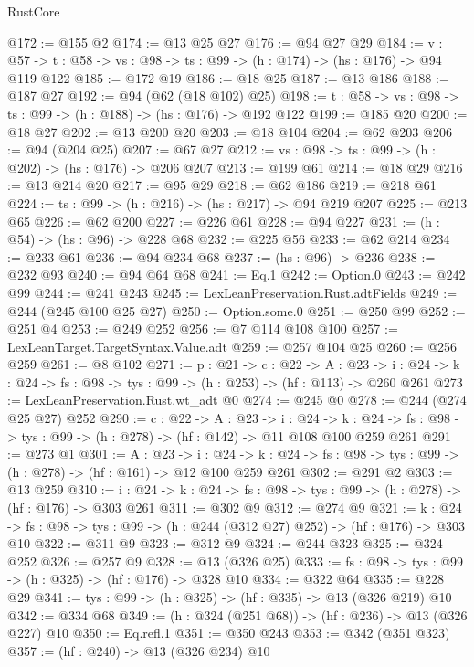 \begin{lexlean}{RustCore}
\begin{coremodule}
@172 := @155 @2
@174 := @13 @25 @27
@176 := @94 @27 @29
@184 := {v : @57} ->
  {t : @58} -> {vs : @98} -> {ts : @99} -> (h : @174) -> (hs : @176) -> @94 @119 @122
@185 := @172 @19
@186 := @18 @25
@187 := @13 @186
@188 := @187 @27
@192 := @94 (@62 (@18 @102) @25)
@198 := {t : @58} -> {vs : @98} -> {ts : @99} -> (h : @188) -> (hs : @176) -> @192 @122
@199 := @185 @20
@200 := @18 @27
@202 := @13 @200 @20
@203 := @18 @104
@204 := @62 @203
@206 := @94 (@204 @25)
@207 := @67 @27
@212 := {vs : @98} -> {ts : @99} -> (h : @202) -> (hs : @176) -> @206 @207
@213 := @199 @61
@214 := @18 @29
@216 := @13 @214 @20
@217 := @95 @29
@218 := @62 @186
@219 := @218 @61
@224 := {ts : @99} -> (h : @216) -> (hs : @217) -> @94 @219 @207
@225 := @213 @65
@226 := @62 @200
@227 := @226 @61
@228 := @94 @227
@231 := (h : @54) -> (hs : @96) -> @228 @68
@232 := @225 @56
@233 := @62 @214
@234 := @233 @61
@236 := @94 @234 @68
@237 := (hs : @96) -> @236
@238 := @232 @93
@240 := @94 @64 @68
@241 := Eq.{1}
@242 := Option.{0}
@243 := @242 @99
@244 := @241 @243
@245 := LexLeanPreservation.Rust.adtFields
@249 := @244 (@245 @100 @25 @27)
@250 := Option.some.{0}
@251 := @250 @99
@252 := @251 @4
@253 := @249 @252
@256 := @7 @114 @108 @100
@257 := LexLeanTarget.TargetSyntax.Value.adt
@259 := @257 @104 @25
@260 := @256 @259
@261 := @8 @102
@271 := {p : @21} ->
  {c : @22} ->
  {A : @23} ->
  {i : @24} -> {k : @24} -> {fs : @98} -> {tys : @99} -> (h : @253) -> (hf : @113) -> @260 @261
@273 := LexLeanPreservation.Rust.wt_adt @0
@274 := @245 @0
@278 := @244 (@274 @25 @27) @252
@290 := {c : @22} ->
  {A : @23} ->
  {i : @24} ->
  {k : @24} -> {fs : @98} -> {tys : @99} -> (h : @278) -> (hf : @142) -> @11 @108 @100 @259 @261
@291 := @273 @1
@301 := {A : @23} ->
  {i : @24} ->
  {k : @24} -> {fs : @98} -> {tys : @99} -> (h : @278) -> (hf : @161) -> @12 @100 @259 @261
@302 := @291 @2
@303 := @13 @259
@310 := {i : @24} ->
  {k : @24} -> {fs : @98} -> {tys : @99} -> (h : @278) -> (hf : @176) -> @303 @261
@311 := @302 @9
@312 := @274 @9
@321 := {k : @24} ->
  {fs : @98} -> {tys : @99} -> (h : @244 (@312 @27) @252) -> (hf : @176) -> @303 @10
@322 := @311 @9
@323 := @312 @9
@324 := @244 @323
@325 := @324 @252
@326 := @257 @9
@328 := @13 (@326 @25)
@333 := {fs : @98} -> {tys : @99} -> (h : @325) -> (hf : @176) -> @328 @10
@334 := @322 @64
@335 := @228 @29
@341 := {tys : @99} -> (h : @325) -> (hf : @335) -> @13 (@326 @219) @10
@342 := @334 @68
@349 := (h : @324 (@251 @68)) -> (hf : @236) -> @13 (@326 @227) @10
@350 := Eq.refl.{1}
@351 := @350 @243
@353 := @342 (@351 @323)
@357 := (hf : @240) -> @13 (@326 @234) @10

\end{coremodule}
\end{lexlean}
